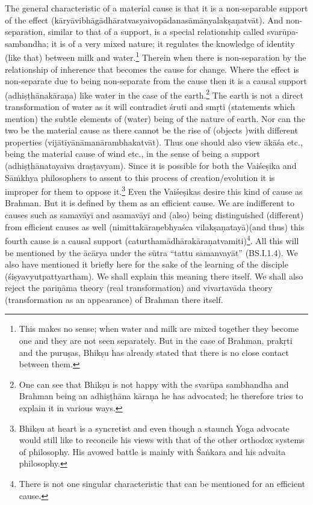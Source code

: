 The general characteristic of a material cause is that it is a non-sepa\-rable support of the effect (kāryāvibhāgādhāratvasyaivopādanasāmān\-yalakṣaṇatvāt). And non-separation, similar to that of a support, is a special relationship called svarūpa-sambandha; it is of a very mixed nature; it regulates the knowledge of identity (like that) between milk and water.\footnote{This makes no sense; when water and milk are mixed together they become one and they are not seen separately. But in the case of Brahman, prakṛti and the puruṣas, Bhikṣu has already stated that there is no close contact between them.} Therein when there is non-separation by the relationship of inherence that becomes the cause for change. Where the effect is non-separate due to being non-separate from the cause then it is a causal support (adhiṣṭhānakāraṇa) like water in the case of the earth.\footnote{One can see that Bhikṣu is not happy with the svarūpa sambhandha and Brahman being an adhiṣṭhāna kāraṇa he has advocated; he therefore tries to explain it in various ways.} The earth is not a direct transformation of water as it will contradict śruti and smṛti (statements which mention) the subtle elements of (water) being of the nature of earth. Nor can the two be the material cause as there cannot be the rise of (objects )with different properties (vijātīyānāmanārambhakatvāt). Thus one should also view ākāśa etc., being the material cause of wind etc., in the sense of being a support (adhiṣṭhānatayaiva draṣṭavyam). Since it is possible for both the Vaiśeṣika and Sāṁkhya philosophers to assent to this process of creation/evolution it is improper for them to oppose it.\footnote{Bhikṣu at heart is a syncretist and even though a staunch Yoga advocate would still like to reconcile his views with that of the other orthodox systems of philosophy. His avowed battle is mainly with Śaṅkara and his advaita philosophy.} Even the Vaiśeṣikas desire this kind of cause as Brahman. But it is defined by them as an efficient cause. We are indifferent to causes such as samavāyī and asamavāyī and (also) being distinguished (different) from efficient causes as well (nimittakāraṇebhyaśca vilakṣaṇatayā)\break (and thus) this fourth cause is a causal support (caturthamādhārakāra\-ṇatvamiti)\footnote{There is not one singular characteristic that can be mentioned for an efficient cause.}. All this will be mentioned by the ācārya under the sūtra “tattu samanvayāt” (BS.I.1.4). We also have mentioned it briefly here for the sake of the learning of the disciple (śiṣyavyutpattyartham). We shall explain this meaning there itself. We shall also reject the pariṇāma theory (real transformation) and vivartavāda theory (transformation as an appearance) of Brahman there itself. 

